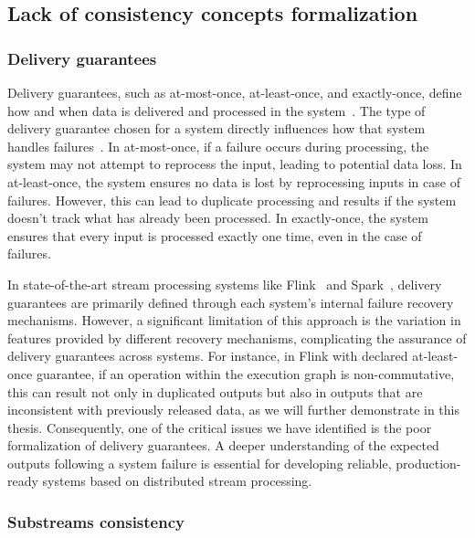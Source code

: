 \subsection{Lack of consistency concepts formalization}

\subsubsection{Delivery guarantees}

Delivery guarantees, such as at-most-once, at-least-once, and exactly-once, define how and when data is delivered and processed in the system~\cite{fragkoulis2024survey, carbone2018scalable, Akidau:2013:MFS:2536222.2536229}. The type of delivery guarantee chosen for a system directly influences how that system handles failures~\cite{zhang2024survey, silvestre2021clonos, wang2021consistency}. In at-most-once, if a failure occurs during processing, the system may not attempt to reprocess the input, leading to potential data loss. In at-least-once, the system ensures no data is lost by reprocessing inputs in case of failures. However, this can lead to duplicate processing and results if the system doesn't track what has already been processed. In exactly-once, the system ensures that every input is processed exactly one time, even in the case of failures.

In state-of-the-art stream processing systems like Flink~\cite{Carbone:2017:SMA:3137765.3137777} and Spark~\cite{Zaharia:2012:DSE:2342763.2342773}, delivery guarantees are primarily defined through each system's internal failure recovery mechanisms. However, a significant limitation of this approach is the variation in features provided by different recovery mechanisms, complicating the assurance of delivery guarantees across systems. For instance, in Flink with declared at-least-once guarantee, if an operation within the execution graph is non-commutative, this can result not only in duplicated outputs but also in outputs that are inconsistent with previously released data, as we will further demonstrate in this thesis. Consequently, one of the critical issues we have identified is the poor formalization of delivery guarantees. A deeper understanding of the expected outputs following a system failure is essential for developing reliable, production-ready systems based on distributed stream processing.

\subsubsection{Substreams consistency}

